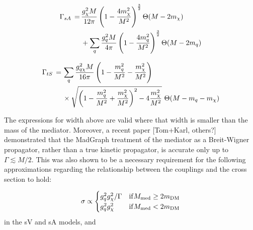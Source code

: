 \begin{equation}
  \begin{split}
    \Gamma_{sA} \, = \, & \frac{g_{\chi}^2 M}{12\pi}\left(1 - \frac{4 m_{\chi}^{2}}{M^{2}}\right)^{\frac{3}{2}} \Theta(M-2 m_{\chi}) \\
                  & + \sum_{\substack{q}}\frac{g_q^2 M}{4\pi}\left(1 - \frac{4m_{q}^{2}}{M^{2}}\right)^{\frac{3}{2}} \Theta(M-2m_q) \\
  \end{split}
\end{equation}

\begin{equation}
  \begin{split}
    \Gamma_{tS} \, = \, & \sum_{\substack{q}} \frac{g_{q \chi}^2M}{16\pi}\left(1 - \frac{m_{q}^{2}}{M^{2}} - \frac{m_{\chi}^{2}}{M^{2}}\right) \\
                  & \times \sqrt{\left(1 - \frac{m_{q}^{2}}{M^{2}} + \frac{m_{\chi}^{2}}{M^{2}}\right)^{2} - 4\frac{m_{\chi}^{2}}{M^{2}}} \,\, \Theta(M-m_q- m_{\chi}) \\
  \end{split}
\end{equation}

The expressions for width above are valid where that width is smaller than the mass of the mediator. Moreover, a recent paper [Tom+Karl, others?] demonstrated that the MadGraph treatment of the mediator as a Breit-Wigner propagator, rather than a true kinetic propagator, is accurate only up to $\Gamma \lesssim M/2$. This was also shown to be a necessary requirement for the following approximations regarding the relationship between the couplings and the cross section to hold:

\begin{equation}
  \sigma \propto
  \begin{cases}
      g_q^2 g_{\chi}^2 / \Gamma & \mathrm{ if } M_{\mathrm{med}} \geq 2 m_{\mathrm{DM}}\\
      g_q^2 g_{\chi}^2 & \mathrm{ if } M_{\mathrm{med}} < 2 m_{\mathrm{DM}}
  \end{cases}
  \label{eq:sigma_propto_couplings_schan}
\end{equation}
in the sV and sA models, and

